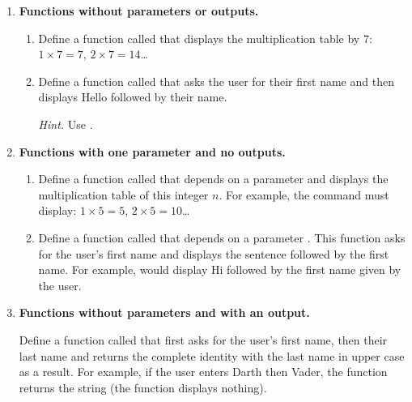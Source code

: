 \documentclass[11pt,class=report,crop=false]{standalone}
\begin{document}

\begin{activite}

\begin{enumerate}
  \item \textbf{Functions without parameters or outputs.}
  \begin{enumerate}
    \item Define a function called  that displays the multiplication table by $7$: $1 \times 7 = 7$, $2\times 7 = 14$\ldots
    
    \item Define a function called  that asks the user for their first name and then displays \og{}Hello\fg{} followed by their name.
    
    \emph{Hint.} Use .
  \end{enumerate}

  \item \textbf{Functions with one parameter and no outputs.}
  \begin{enumerate}
    \item Define a function called  that depends on a parameter  and displays the multiplication table of this integer $n$.
    For example, the command  must display: $1 \times 5 = 5$, $2\times 5 = 10$\ldots
    
    \item Define a function called  that depends on a parameter . This function asks for the user's first name and displays the sentence followed by the first name. For example,  would display \og{}Hi\fg{} followed by the first name given by the user.
  \end{enumerate}  
  
  \item \textbf{Functions without parameters and with an output.}
  
Define a function called  that first asks for the user's first name, then their last name and returns the complete identity with the last name in upper case as a result. For example, if the user enters \og{}Darth\fg{} then \og{}Vader\fg{}, the function returns the string  (the function displays nothing).


\end{enumerate}
\end{activite}
\end{document}
